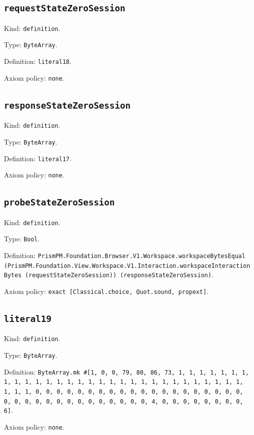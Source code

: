\documentclass[11pt]{article}
\begin{document}
\subsection*{\texttt{requestStateZeroSession}}
\noindent Kind: \texttt{definition}.\par
\noindent Type: \texttt{ByteArray}.\par
\noindent Definition: \texttt{literal18}.\par
\noindent Axiom policy: \texttt{none}.\par
\subsection*{\texttt{responseStateZeroSession}}
\noindent Kind: \texttt{definition}.\par
\noindent Type: \texttt{ByteArray}.\par
\noindent Definition: \texttt{literal17}.\par
\noindent Axiom policy: \texttt{none}.\par
\subsection*{\texttt{probeStateZeroSession}}
\noindent Kind: \texttt{definition}.\par
\noindent Type: \texttt{Bool}.\par
\noindent Definition: \texttt{PrismPM.Foundation.Browser.V1.Workspace.workspaceBytesEqual (PrismPM.Foundation.View.Workspace.V1.Interaction.workspaceInteractionBytes (requestStateZeroSession)) (responseStateZeroSession)}.\par
\noindent Axiom policy: \texttt{exact [Classical.choice, Quot.sound, propext]}.\par
\subsection*{\texttt{literal19}}
\noindent Kind: \texttt{definition}.\par
\noindent Type: \texttt{ByteArray}.\par
\noindent Definition: \texttt{ByteArray.mk \#[1, 0, 0, 79, 80, 86, 73, 1, 1, 1, 1, 1, 1, 1, 1, 1, 1, 1, 1, 1, 1, 1, 1, 1, 1, 1, 1, 1, 1, 1, 1, 1, 1, 1, 1, 1, 1, 1, 1, 1, 0, 0, 0, 0, 0, 0, 0, 0, 0, 0, 0, 0, 0, 0, 0, 0, 0, 0, 0, 0, 0, 0, 0, 0, 0, 0, 0, 0, 0, 0, 0, 0, 0, 0, 4, 0, 0, 0, 0, 0, 0, 0, 0, 6]}.\par
\noindent Axiom policy: \texttt{none}.\par
\end{document}
